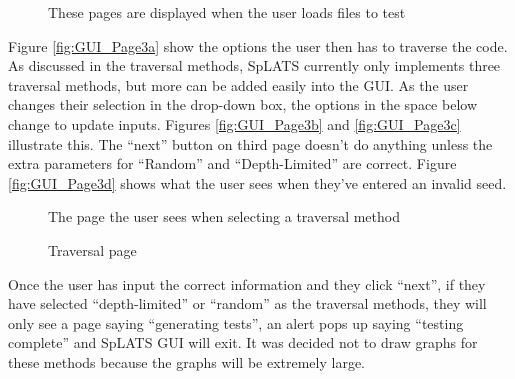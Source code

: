   \begin{figure}
    \centering
    \caption{These pages are displayed when the user loads files to test}
    \label{fig:GUI_LoadVersions}
  \end{figure}
  
  Figure \ref{fig:GUI_Page3a} show the options the user then has to traverse the code. As discussed in the traversal methods, SpLATS currently only implements three traversal methods, but more can be added easily into the GUI. As the user changes their selection in the drop-down box, the options in the space below change to update inputs. Figures \ref{fig:GUI_Page3b} and \ref{fig:GUI_Page3c} illustrate this. The ``next'' button on third page doesn't do anything unless the extra parameters for ``Random'' and ``Depth-Limited'' are correct. Figure \ref{fig:GUI_Page3d} shows what the user sees when they've entered an invalid seed.
  
  \begin{figure}
    \centering
    \caption{The page the user sees when selecting a traversal method}
    \label{fig:GUI_SelectTraversal1}
  \end{figure}
  
  \begin{figure}
    \centering
    \caption{Traversal page}
    \label{fig:GUI_SelectTraversal2}
  \end{figure}
  
  Once the user has input the correct information and they click ``next'', if they have selected ``depth-limited'' or ``random'' as the traversal methods, they will only see a page saying ``generating tests'', an alert pops up saying ``testing complete'' and SpLATS GUI will exit. It was decided not to draw graphs for these methods because the graphs will be extremely large.
  
